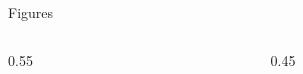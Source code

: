 \documentclass[10pt,aspectratio=169,notheorems]{beamer}
\begin{document}
\begin{frame}{Figures}
  \begin{columns}
    \begin{column}{0.55\textwidth}
    \end{column}
    \begin{column}{0.45\textwidth}
    \end{column}
  \end{columns}
\end{frame}
\end{document}
